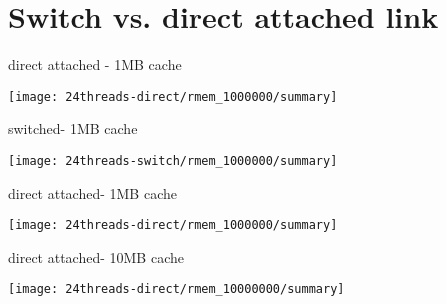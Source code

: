 \section{Switch vs. direct attached link}

\begin{frame}{direct attached - 1MB cache}{}
	\begin{center} 
		\texttt{[image: 24threads-direct/rmem\_1000000/summary]}
	\end{center} 
\end{frame}

\begin{frame}{switched- 1MB cache}{}
	\begin{center} 
		\texttt{[image: 24threads-switch/rmem\_1000000/summary]}
	\end{center} 
\end{frame}


\begin{frame}{direct attached- 1MB cache}{}
	\begin{center} 
		\texttt{[image: 24threads-direct/rmem\_1000000/summary]}
	\end{center} 
\end{frame}

\begin{frame}{direct attached- 10MB cache}{}
	\begin{center} 
		\texttt{[image: 24threads-direct/rmem\_10000000/summary]}
	\end{center} 
\end{frame}
